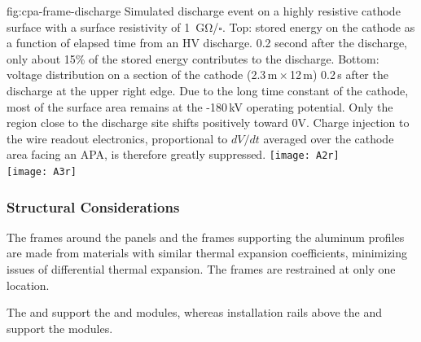 \begin{dunefigure}
{fig:cpa-frame-discharge}
{Simulated discharge event on a highly resistive cathode surface with a surface resistivity of \SI{1}{\giga\ohm}/$\square$. Top:  stored energy on the cathode as a function of elapsed time from an HV discharge. 0.2 second after the discharge, only about 15\% of the stored energy contributes to the discharge. Bottom: voltage distribution on a section of the cathode (2.3\,m\,$\times$\,12\,m) 0.2\,s after the discharge at the upper right edge.  Due to the long time constant of the cathode, most of the surface area remains at the -180\,kV operating potential. Only the region close to the discharge site shifts positively toward 0V. Charge injection to the wire readout electronics, proportional to $dV/dt$ averaged over the cathode area facing an APA, is therefore greatly suppressed. }
\centering
\texttt{[image: A2r]} \\ \vspace{20pt}    %
\texttt{[image: A3r]}
\end{dunefigure}



\subsubsection{Structural Considerations}

The frames around the  panels and the frames supporting the  aluminum profiles  
are made from materials with similar thermal expansion coefficients, minimizing issues of differential thermal expansion. The  frames 
are restrained at only one location.  

The  and  support the  and  modules, whereas
installation rails above the  and  support the  modules. 

